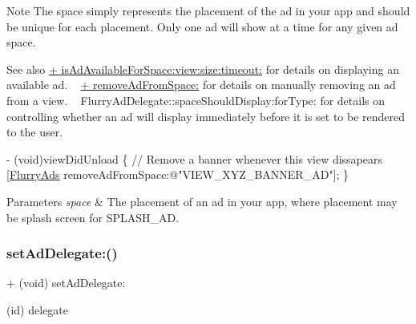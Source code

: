 \begin{DoxyNote}{Note}
The {\ttfamily space} simply represents the placement of the ad in your app and should be unique for each placement. Only one ad will show at a time for any given ad space.
\end{DoxyNote}
\begin{DoxySeeAlso}{See also}
\hyperlink{interfaceFlurryAds_abf047d7df31c163b9b5d4c706827419f}{+ is\+Ad\+Available\+For\+Space\+:view\+:size\+:timeout\+:} for details on displaying an available ad. ~\newline
\hyperlink{interfaceFlurryAds_aaf30e23048de55a1adb8a2c067428be6}{+ remove\+Ad\+From\+Space\+:} for details on manually removing an ad from a view. ~\newline
Flurry\+Ad\+Delegate\+::space\+Should\+Display\+:for\+Type\+: for details on controlling whether an ad will display immediately before it is set to be rendered to the user.
\end{DoxySeeAlso}

\begin{DoxyCode}
- (void)viewDidUnload 
\{
    \textcolor{comment}{// Remove a banner whenever this view dissapears}
    [\hyperlink{interfaceFlurryAds}{FlurryAds} removeAdFromSpace:\textcolor{stringliteral}{@"VIEW\_XYZ\_BANNER\_AD"}];
\}
\end{DoxyCode}



\begin{DoxyParams}{Parameters}
{\em space} & The placement of an ad in your app, where placement may be splash screen for S\+P\+L\+A\+S\+H\+\_\+\+AD. \\
\hline
\end{DoxyParams}
\mbox{\label{interfaceFlurryAds_a647e20365b75b7f0e4337660aa51b116}} 
\subsubsection{\texorpdfstring{set\+Ad\+Delegate\+:()}{setAdDelegate:()}}
{\footnotesize\ttfamily + (void) set\+Ad\+Delegate\+: \begin{DoxyParamCaption}\item[{(id)}]{delegate }\end{DoxyParamCaption}}



